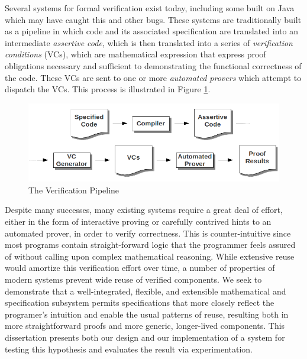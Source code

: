Several systems for formal verification exist today, including some built on Java which may have caught this and other bugs.  These systems are traditionally built as a pipeline in which code and its associated specification are translated into an intermediate \emph{assertive code}, which is then translated into a series of \emph{verification conditions} (VCs), which are mathematical expression that express proof obligations necessary and sufficient to demonstrating the functional correctness of the code.  These VCs are sent to one or more \emph{automated provers} which attempt to dispatch the VCs.  This process is illustrated in Figure \ref{fig:pipeline}.

\begin{figure}
  \centering
    \includegraphics[width=\textwidth]{verification_pipeline}
  \caption{The Verification Pipeline\label{fig:pipeline}}
\end{figure}

Despite many successes, many existing systems require a great deal of effort, either in the form of interactive proving or carefully contrived hints to an automated prover, in order to verify correctness.  This is counter-intuitive since most programs contain straight-forward logic that the programmer feels assured of without calling upon complex mathematical reasoning.  While extensive reuse would amortize this verification effort over time, a number of properties of modern systems prevent wide reuse of verified components.  We seek to demonstrate that a well-integrated, flexible, and extensible mathematical and specification subsystem permits specifications that more closely reflect the programer's intuition and enable the usual patterns of reuse, resulting both in more straightforward proofs and more generic, longer-lived components.  This dissertation presents both our design and our implementation of a system for testing this hypothesis and evaluates the result via experimentation.

